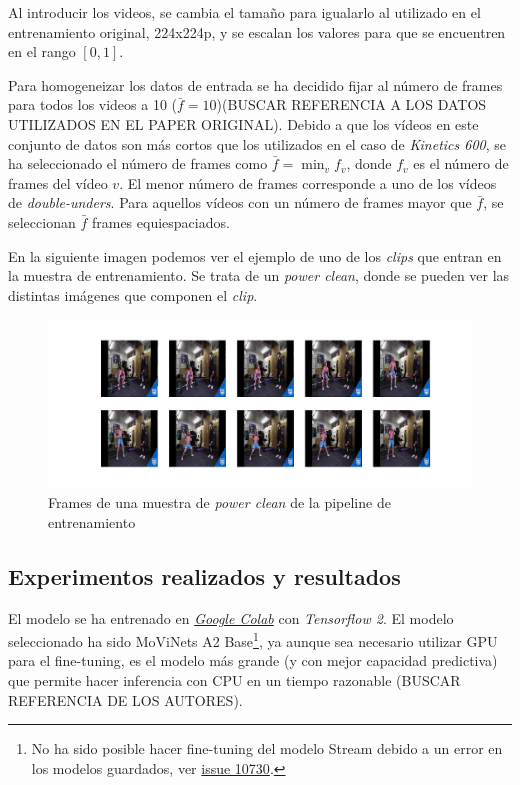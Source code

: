 Al introducir los videos, se cambia el tamaño para igualarlo al utilizado en el entrenamiento original, 224x224p, y se escalan los valores para que se encuentren en el rango $[0, 1]$.

Para homogeneizar los datos de entrada se ha decidido fijar al número de frames para todos los videos a 10 ($\bar{f}=10$)(BUSCAR REFERENCIA A LOS DATOS UTILIZADOS EN EL PAPER ORIGINAL). Debido a que los vídeos en este conjunto de datos son más cortos que los utilizados en el caso de \textit{Kinetics 600}, se ha seleccionado el número de frames como $\bar{f} = \min_v f_{v}$, donde $f_v$ es el número de frames del vídeo $v$. El menor número de frames corresponde a uno de los vídeos de \textit{double-unders}. Para aquellos vídeos con un número de frames mayor que $\bar{f}$, se seleccionan $\bar{f}$ frames equiespaciados.

En la siguiente imagen podemos ver el ejemplo de uno de los \textit{clips} que entran en la muestra de entrenamiento. Se trata de un \textit{power clean}, donde se pueden ver las distintas imágenes que componen el \textit{clip}.

\begin{figure}[H]
    \centerline{\includegraphics[width=1.25\linewidth]{figs/frames.png}}
\caption{Frames de una muestra de \textit{power clean} de la pipeline de entrenamiento}\label{frames}
\end{figure}

\subsection{Experimentos realizados y resultados}

El modelo se ha entrenado en \href{https://colab.research.google.com/?hl=es}{\textit{Google Colab}} con \textit{Tensorflow 2}. El modelo seleccionado ha sido MoViNets A2 Base\footnote{No ha sido posible hacer fine-tuning del modelo Stream debido a un error en los modelos guardados, ver \href{https://github.com/tensorflow/models/issues/10730}{issue 10730}.}, ya aunque sea necesario utilizar GPU para el fine-tuning, es el modelo más grande (y con mejor capacidad predictiva) que permite hacer inferencia con CPU en un tiempo razonable (BUSCAR REFERENCIA DE LOS AUTORES).

